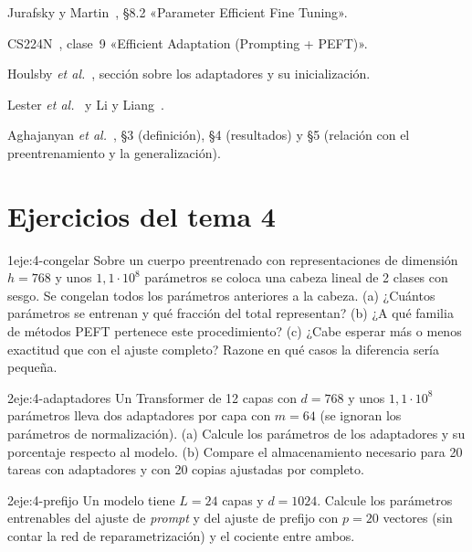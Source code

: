 \begin{lecturas}
\item Jurafsky y Martin~\cite{jm3}, §8.2 «Parameter Efficient Fine Tuning».
\item CS224N~\cite{cs224n}, clase~9 «Efficient Adaptation (Prompting + PEFT)».
\item Houlsby \emph{et al.}~\cite{houlsby}, sección sobre los adaptadores y su inicialización.
\item Lester \emph{et al.}~\cite{lester} y Li y Liang~\cite{li-liang}.
\item Aghajanyan \emph{et al.}~\cite{aghajanyan}, §3 (definición), §4 (resultados) y §5 (relación con el preentrenamiento y la generalización).
\end{lecturas}

\section*{Ejercicios del tema 4}

\begin{ejercicio}{1}{eje:4-congelar}
Sobre un cuerpo preentrenado con representaciones de dimensión $h=768$ y unos $1{,}1\cdot 10^{8}$ parámetros se coloca una cabeza lineal de 2 clases con sesgo. Se congelan todos los parámetros anteriores a la cabeza. (a) ¿Cuántos parámetros se entrenan y qué fracción del total representan? (b) ¿A qué familia de métodos PEFT pertenece este procedimiento? (c) ¿Cabe esperar más o menos exactitud que con el ajuste completo? Razone en qué casos la diferencia sería pequeña.
\end{ejercicio}

\begin{ejercicio}{2}{eje:4-adaptadores}
Un Transformer de 12 capas con $d=768$ y unos $1{,}1\cdot 10^{8}$ parámetros lleva dos adaptadores por capa con $m=64$ (se ignoran los parámetros de normalización). (a) Calcule los parámetros de los adaptadores y su porcentaje respecto al modelo. (b) Compare el almacenamiento necesario para 20 tareas con adaptadores y con 20 copias ajustadas por completo.
\end{ejercicio}

\begin{ejercicio}{2}{eje:4-prefijo}
Un modelo tiene $L=24$ capas y $d=1024$. Calcule los parámetros entrenables del ajuste de \emph{prompt} y del ajuste de prefijo con $p=20$ vectores (sin contar la red de reparametrización) y el cociente entre ambos.
\end{ejercicio}

